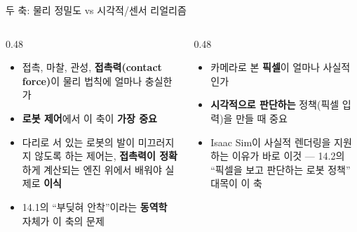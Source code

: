 \documentclass[aspectratio=169,11pt]{beamer}
\begin{document}
\begin{frame}{두 축: 물리 정밀도 vs 시각적/센서 리얼리즘}
  \begin{columns}[T]
    \begin{column}{0.48\textwidth}
      \begin{itemize}
        \item 접촉, 마찰, 관성, \textbf{접촉력(contact force)}이
          물리 법칙에 얼마나 충실한가
        \item \textbf{로봇 제어}에서 이 축이 \textbf{가장 중요}
        \item 다리로 서 있는 로봇의 발이 미끄러지지 않도록 하는
          제어는, \textbf{접촉력이 정확}하게 계산되는 엔진 위에서
          배워야 실제로 \textbf{이식}
        \item 14.1의 ``부딪혀 안착''이라는 \textbf{동역학} 자체가
          이 축의 문제
      \end{itemize}
    \end{column}
    \begin{column}{0.48\textwidth}
      \begin{itemize}
        \item 카메라로 본 \textbf{픽셀}이 얼마나 사실적인가
        \item \textbf{시각적으로 판단하는} 정책(픽셀 입력)을 만들
          때 중요
        \item Isaac Sim이 사실적 렌더링을 지원하는 이유가 바로
          이것 --- 14.2의 ``픽셀을 보고 판단하는 로봇 정책''
          대목이 이 축
      \end{itemize}
    \end{column}
  \end{columns}
\end{frame}
\end{document}
